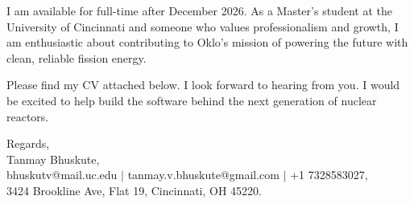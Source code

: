 \documentclass[11pt]{letter}
\begin{document}
\begin{letter}{}
I am available for full-time after December 2026. As a Master's student at the University of Cincinnati and someone who values professionalism and growth, I am enthusiastic about contributing to Oklo's mission of powering the future with clean, reliable fission energy.

Please find my CV attached below. I look forward to hearing from you. I would be excited to help build the software behind the next generation of nuclear reactors.

{\setlength{\parskip}{0pt}
Regards,\\
Tanmay Bhuskute,\\
bhuskutv@mail.uc.edu $\mid$ tanmay.v.bhuskute@gmail.com $\mid$ +1 7328583027,\\
3424 Brookline Ave, Flat 19, Cincinnati, OH 45220.
}

\end{letter}
\end{document}
